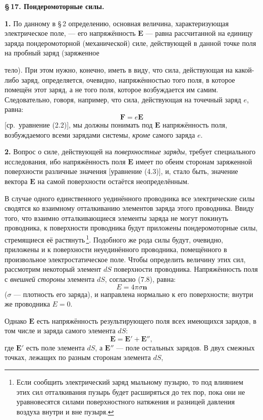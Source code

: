 \documentclass[a4paper,12pt]{article}
\begin{document}
\bigskip
\noindent\textbf{\S\,17. Пондеромоторные силы.}

\medskip
\textbf{1.} По данному в §\,2 определению, основная величина,
характеризующая электрическое поле, — его напряжённость $\mathbf{E}$ —
равна рассчитанной на единицу заряда пондеромоторной (механической)
силе, действующей в данной точке поля на пробный заряд (заряженное


тело). При этом нужно, конечно, иметь в виду, что сила, действующая
на какой-либо заряд, определяется, очевидно, напряжённостью того поля,
в которое помещён этот заряд, а не того поля, которое возбуждается им
самим. Следовательно, говоря, например, что сила, действующая на
точечный заряд $e$, равна:
\begin{equation}
    \mathbf{F} = e\mathbf{E}
    \tag{17.1}
\end{equation}
[ср.\ уравнение (2.2)], мы должны понимать под $\mathbf{E}$ напряжённость
поля, возбуждаемого всеми зарядами системы, \textit{кроме} самого
заряда $e$.

\textbf{2.} Вопрос о силе, действующей на \textit{поверхностные заряды},
требует специального исследования, ибо напряжённость поля $\mathbf{E}$
имеет по обеим сторонам заряженной поверхности различные значения
[уравнение (4.3)], и, стало быть, значение вектора $\mathbf{E}$ на самой
поверхности остаётся неопределённым.

В случае одного единственного уединённого проводника все электрические
силы сводятся ко взаимному отталкиванию элементов заряда этого
проводника. Ввиду того, что взаимно отталкивающиеся элементы заряда
не могут покинуть проводника, к поверхности проводника будут приложены
пондеромоторные силы, стремящиеся её растянуть\,\footnote{Если сообщить
электрический заряд мыльному пузырю, то под влиянием этих сил
отталкивания пузырь будет расширяться до тех пор, пока они не
уравновесятся силами поверхностного натяжения и разницей давления
воздуха внутри и вне пузыря.}. Подобного же рода силы будут, очевидно,
приложены и к поверхности неуединённого проводника, помещённого
в произвольное электростатическое поле. Чтобы определить величину этих
сил, рассмотрим некоторый элемент $dS$ поверхности проводника.
Напряжённость поля с \textit{внешней стороны} элемента $dS$, согласно
(7.8), равна:
$$
    E = 4\pi\sigma\mathbf{n}
$$
($\sigma$ — плотность его заряда), и направлена нормально к его
поверхности; внутри же проводника $E = 0$.

Однако $\mathbf{E}$ есть напряжённость результирующего поля всех
имеющихся зарядов, в том числе и заряда самого элемента $dS$:
$$
    \mathbf{E} = \mathbf{E}' + \mathbf{E}'',
$$
где $\mathbf{E}'$ есть поле элемента $dS$, а $\mathbf{E}''$ — поле
остальных зарядов. В двух смежных точках, лежащих по разным сторонам
элемента $dS$,
\end{document}
